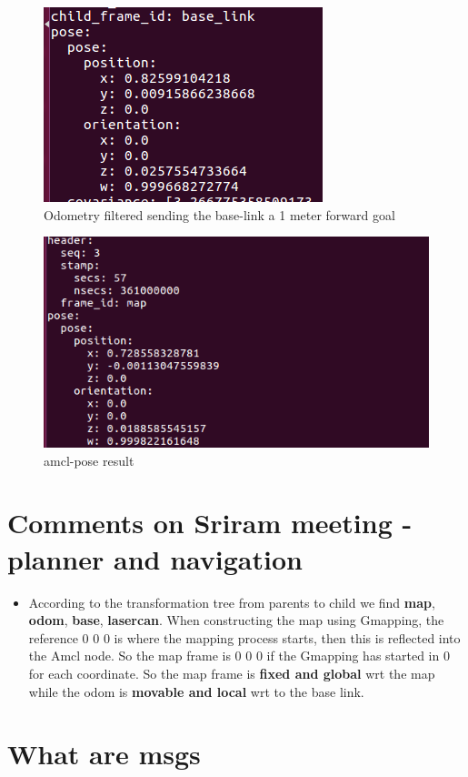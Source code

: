 \documentclass[11pt,a4paper]{article}
\begin{document}
\begin{figure}[!htb]
	\center
	\includegraphics[width=.4\textwidth]{figures/odom_filtered.png}
	\caption{Odometry filtered sending the base-link a 1 meter forward goal}
	\label{fig:odom_filtered}
\end{figure}

\begin{figure}[!htb]
	\center
	\includegraphics[width=.4\textwidth]{figures/amcl_pose.png}
	\caption{amcl-pose result}
	\label{fig:amcl_pose}
\end{figure}



\section{Comments on Sriram meeting - planner and navigation} \label{sriram}

\begin{itemize}
\item According to the transformation tree from parents to child we find \textbf{map}, \textbf{odom}, \textbf{base}, \textbf{lasercan}. When constructing the map using Gmapping, the reference 0 0 0 is where the mapping process starts, then this is reflected into the Amcl node. So the map frame is 0 0 0 if the Gmapping has started in 0 for each coordinate. So the map frame is \textbf{fixed and global} wrt the map while the odom is \textbf{movable and local} wrt to the base link. 
\end{itemize}


\section{What are msgs}
\end{document}
